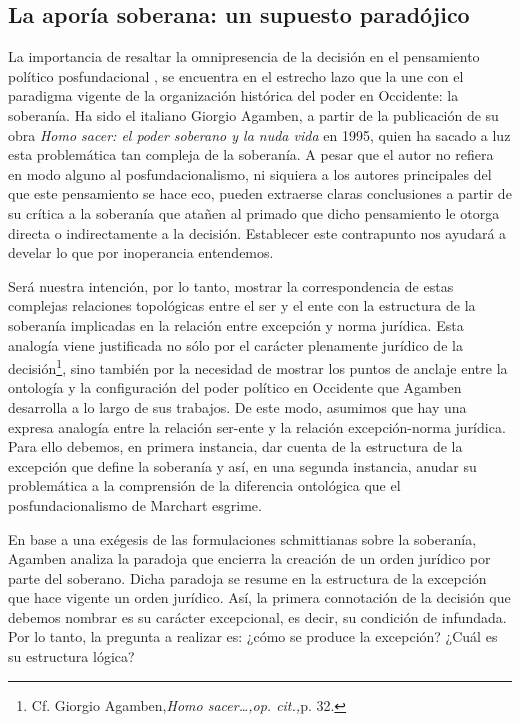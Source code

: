 \subsection{La aporía soberana: un supuesto paradójico}

La importancia de resaltar la omnipresencia de la decisión en el pensamiento político posfundacional , se encuentra en el estrecho lazo que la une con el paradigma vigente de la organización histórica del poder en Occidente: la soberanía. Ha sido el italiano Giorgio Agamben, a partir de la publicación de su obra \emph{Homo sacer: el poder soberano y la nuda vida} en 1995, quien ha sacado a luz esta problemática tan compleja de la soberanía. A pesar que el autor no refiera en modo alguno al posfundacionalismo, ni siquiera a los autores principales del que este pensamiento se hace eco, pueden extraerse claras conclusiones a partir de su crítica a la soberanía que atañen al primado que dicho pensamiento le otorga directa o indirectamente a la decisión. Establecer este contrapunto nos ayudará a develar lo que por inoperancia entendemos.

Será nuestra intención, por lo tanto, mostrar la correspondencia de estas complejas relaciones topológicas entre el ser y el ente con la estructura de la soberanía implicadas en la relación entre excepción y norma jurídica. Esta analogía viene justificada no sólo por el carácter plenamente jurídico de la decisión\footnote{Cf. Giorgio Agamben,\emph{Homo sacer\ldots,op. cit.,}p. 32.}, sino también por la necesidad de mostrar los puntos de anclaje entre la ontología y la configuración del poder político en Occidente que Agamben desarrolla a lo largo de sus trabajos. De este modo, asumimos que hay una expresa analogía entre la relación ser-ente y la relación excepción-norma jurídica. Para ello debemos, en primera instancia, dar cuenta de la estructura de la excepción que define la soberanía y así, en una segunda instancia, anudar su problemática a la comprensión de la diferencia ontológica que el posfundacionalismo de Marchart esgrime.

En base a una exégesis de las formulaciones schmittianas sobre la soberanía, Agamben analiza la paradoja que encierra la creación de un orden jurídico por parte del soberano. Dicha paradoja se resume en la estructura de la excepción que hace vigente un orden jurídico. Así, la primera connotación de la decisión que debemos nombrar es su carácter excepcional, es decir, su condición de infundada. Por lo tanto, la pregunta a realizar es: ¿cómo se produce la excepción? ¿Cuál es su estructura lógica?

